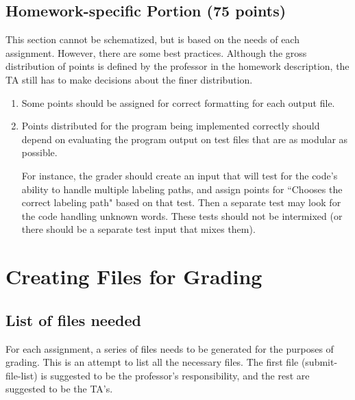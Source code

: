\documentclass[12pt]{article}
\begin{document}
\subsection{Homework-specific Portion (75 points)} \label{sec:specificrubric}

This section cannot be schematized, but is based on the needs of each assignment. However, there are some best practices. Although the gross distribution of points is defined by the professor in the homework description, the TA still has to make decisions about the finer distribution.

\begin{enumerate}
\item {Some points should be assigned for correct formatting for each output file.}
 
\item {Points distributed for the program being implemented correctly should depend on evaluating the program output on test files that are as modular as possible.

For instance, the grader should create an input that will test for the code's ability to handle multiple labeling paths, and assign points for ``Chooses the correct labeling path" based on that test. Then a separate test may look for the code handling unknown words. These tests should not be intermixed (or there should be a separate test input that mixes them). }
 
\end{enumerate}


\section{Creating Files for Grading} \label{sec:files}

\subsection{List of files needed} \label{sec:fileslist}

For each assignment, a series of files needs to be generated for the purposes of grading. This is an attempt to list all the necessary files. The first file (submit-file-list) is suggested to be the professor's responsibility, and the rest are suggested to be the TA's.
\end{document}
